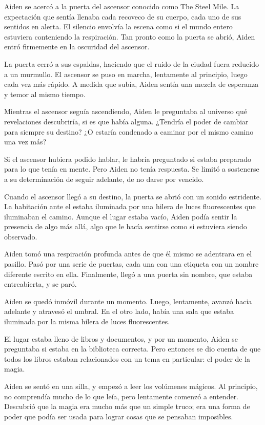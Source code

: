 


Aiden se acercó a la puerta del ascensor conocido como The Steel Mile. La expectación que sentía llenaba cada recoveco de su cuerpo, cada uno de sus sentidos en alerta. El silencio envolvía la escena como si el mundo entero estuviera conteniendo la respiración. Tan pronto como la puerta se abrió, Aiden entró firmemente en la oscuridad del ascensor.

La puerta cerró a sus espaldas, haciendo que el ruido de la ciudad fuera reducido a un murmullo. El ascensor se puso en marcha, lentamente al principio, luego cada vez más rápido. A medida que subía, Aiden sentía una mezcla de esperanza y temor al mismo tiempo.

Mientras el ascensor seguía ascendiendo, Aiden le preguntaba al universo qué revelaciones descubriría, si es que había alguna. ¿Tendría el poder de cambiar para siempre su destino? ¿O estaría condenado a caminar por el mismo camino una vez más?

Si el ascensor hubiera podido hablar, le habría preguntado si estaba preparado para lo que tenía en mente. Pero Aiden no tenía respuesta. Se limitó a sostenerse a su determinación de seguir adelante, de no darse por vencido.

Cuando el ascensor llegó a su destino, la puerta se abrió con un sonido estridente. La habitación ante el estaba iluminada por una hilera de luces fluorescentes que iluminaban el camino. Aunque el lugar estaba vacío, Aiden podía sentir la presencia de algo más allá, algo que le hacía sentirse como si estuviera siendo observado.

Aiden tomó una respiración profunda antes de que él mismo se adentrara en el pasillo. Pasó por una serie de puertas, cada una con una etiqueta con un nombre diferente escrito en ella. Finalmente, llegó a una puerta sin nombre, que estaba entreabierta, y se paró.

Aiden se quedó inmóvil durante un momento. Luego, lentamente, avanzó hacia adelante y atravesó el umbral. En el otro lado, había una sala que estaba iluminada por la misma hilera de luces fluorescentes.

El lugar estaba lleno de libros y documentos, y por un momento, Aiden se preguntaba si estaba en la biblioteca correcta. Pero entonces se dio cuenta de que todos los libros estaban relacionados con un tema en particular: el poder de la magia.

Aiden se sentó en una silla, y empezó a leer los volúmenes mágicos. Al principio, no comprendía mucho de lo que leía, pero lentamente comenzó a entender. Descubrió que la magia era mucho más que un simple truco; era una forma de poder que podía ser usada para lograr cosas que se pensaban imposibles.

